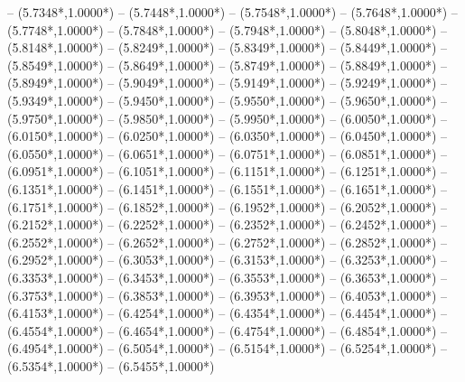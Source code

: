{	-- ({5.7348*\dx},{1.0000*\dy})
	-- ({5.7448*\dx},{1.0000*\dy})
	-- ({5.7548*\dx},{1.0000*\dy})
	-- ({5.7648*\dx},{1.0000*\dy})
	-- ({5.7748*\dx},{1.0000*\dy})
	-- ({5.7848*\dx},{1.0000*\dy})
	-- ({5.7948*\dx},{1.0000*\dy})
	-- ({5.8048*\dx},{1.0000*\dy})
	-- ({5.8148*\dx},{1.0000*\dy})
	-- ({5.8249*\dx},{1.0000*\dy})
	-- ({5.8349*\dx},{1.0000*\dy})
	-- ({5.8449*\dx},{1.0000*\dy})
	-- ({5.8549*\dx},{1.0000*\dy})
	-- ({5.8649*\dx},{1.0000*\dy})
	-- ({5.8749*\dx},{1.0000*\dy})
	-- ({5.8849*\dx},{1.0000*\dy})
	-- ({5.8949*\dx},{1.0000*\dy})
	-- ({5.9049*\dx},{1.0000*\dy})
	-- ({5.9149*\dx},{1.0000*\dy})
	-- ({5.9249*\dx},{1.0000*\dy})
	-- ({5.9349*\dx},{1.0000*\dy})
	-- ({5.9450*\dx},{1.0000*\dy})
	-- ({5.9550*\dx},{1.0000*\dy})
	-- ({5.9650*\dx},{1.0000*\dy})
	-- ({5.9750*\dx},{1.0000*\dy})
	-- ({5.9850*\dx},{1.0000*\dy})
	-- ({5.9950*\dx},{1.0000*\dy})
	-- ({6.0050*\dx},{1.0000*\dy})
	-- ({6.0150*\dx},{1.0000*\dy})
	-- ({6.0250*\dx},{1.0000*\dy})
	-- ({6.0350*\dx},{1.0000*\dy})
	-- ({6.0450*\dx},{1.0000*\dy})
	-- ({6.0550*\dx},{1.0000*\dy})
	-- ({6.0651*\dx},{1.0000*\dy})
	-- ({6.0751*\dx},{1.0000*\dy})
	-- ({6.0851*\dx},{1.0000*\dy})
	-- ({6.0951*\dx},{1.0000*\dy})
	-- ({6.1051*\dx},{1.0000*\dy})
	-- ({6.1151*\dx},{1.0000*\dy})
	-- ({6.1251*\dx},{1.0000*\dy})
	-- ({6.1351*\dx},{1.0000*\dy})
	-- ({6.1451*\dx},{1.0000*\dy})
	-- ({6.1551*\dx},{1.0000*\dy})
	-- ({6.1651*\dx},{1.0000*\dy})
	-- ({6.1751*\dx},{1.0000*\dy})
	-- ({6.1852*\dx},{1.0000*\dy})
	-- ({6.1952*\dx},{1.0000*\dy})
	-- ({6.2052*\dx},{1.0000*\dy})
	-- ({6.2152*\dx},{1.0000*\dy})
	-- ({6.2252*\dx},{1.0000*\dy})
	-- ({6.2352*\dx},{1.0000*\dy})
	-- ({6.2452*\dx},{1.0000*\dy})
	-- ({6.2552*\dx},{1.0000*\dy})
	-- ({6.2652*\dx},{1.0000*\dy})
	-- ({6.2752*\dx},{1.0000*\dy})
	-- ({6.2852*\dx},{1.0000*\dy})
	-- ({6.2952*\dx},{1.0000*\dy})
	-- ({6.3053*\dx},{1.0000*\dy})
	-- ({6.3153*\dx},{1.0000*\dy})
	-- ({6.3253*\dx},{1.0000*\dy})
	-- ({6.3353*\dx},{1.0000*\dy})
	-- ({6.3453*\dx},{1.0000*\dy})
	-- ({6.3553*\dx},{1.0000*\dy})
	-- ({6.3653*\dx},{1.0000*\dy})
	-- ({6.3753*\dx},{1.0000*\dy})
	-- ({6.3853*\dx},{1.0000*\dy})
	-- ({6.3953*\dx},{1.0000*\dy})
	-- ({6.4053*\dx},{1.0000*\dy})
	-- ({6.4153*\dx},{1.0000*\dy})
	-- ({6.4254*\dx},{1.0000*\dy})
	-- ({6.4354*\dx},{1.0000*\dy})
	-- ({6.4454*\dx},{1.0000*\dy})
	-- ({6.4554*\dx},{1.0000*\dy})
	-- ({6.4654*\dx},{1.0000*\dy})
	-- ({6.4754*\dx},{1.0000*\dy})
	-- ({6.4854*\dx},{1.0000*\dy})
	-- ({6.4954*\dx},{1.0000*\dy})
	-- ({6.5054*\dx},{1.0000*\dy})
	-- ({6.5154*\dx},{1.0000*\dy})
	-- ({6.5254*\dx},{1.0000*\dy})
	-- ({6.5354*\dx},{1.0000*\dy})
	-- ({6.5455*\dx},{1.0000*\dy})
}

